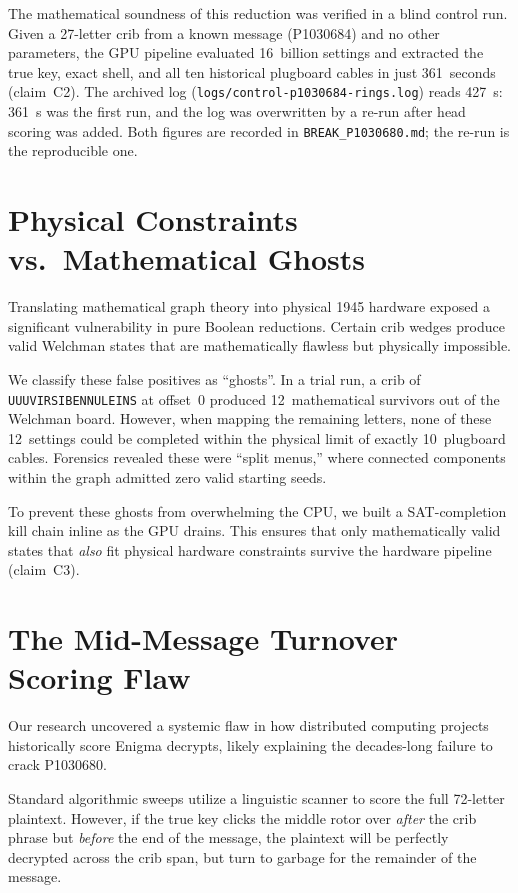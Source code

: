 \documentclass[11pt,a4paper]{article}
\begin{document}
The mathematical soundness of this reduction was verified in a blind
control run.
Given a 27-letter crib from a known message (P1030684) and no other
parameters, the GPU pipeline evaluated 16~billion settings and extracted
the true key, exact shell, and all ten historical plugboard cables in
just 361~seconds (claim~C2). The archived log
(\texttt{logs/control-p1030684-rings.log}) reads 427~s: 361~s was the first
run, and the log was overwritten by a re-run after head scoring was added.
Both figures are recorded in \texttt{BREAK\_P1030680.md}; the re-run is the
reproducible one.

\section{Physical Constraints vs.\ Mathematical Ghosts}

Translating mathematical graph theory into physical 1945 hardware exposed
a significant vulnerability in pure Boolean reductions.
Certain crib wedges produce valid Welchman states that are mathematically
flawless but physically impossible.

We classify these false positives as ``ghosts''.
In a trial run, a crib of \texttt{UUUVIRSIBENNULEINS} at offset~0 produced
12~mathematical survivors out of the Welchman board.
However, when mapping the remaining letters, none of these 12~settings
could be completed within the physical limit of exactly 10~plugboard
cables.
Forensics revealed these were ``split menus,'' where connected components
within the graph admitted zero valid starting seeds.

To prevent these ghosts from overwhelming the CPU, we built a
SAT-completion kill chain inline as the GPU drains.
This ensures that only mathematically valid states that \emph{also} fit
physical hardware constraints survive the hardware pipeline (claim~C3).

\section{The Mid-Message Turnover Scoring Flaw}

Our research uncovered a systemic flaw in how distributed computing
projects historically score Enigma decrypts, likely explaining the
decades-long failure to crack P1030680.

Standard algorithmic sweeps utilize a linguistic scanner to score the
full 72-letter plaintext.
However, if the true key clicks the middle rotor over \emph{after} the
crib phrase but \emph{before} the end of the message, the plaintext will
be perfectly decrypted across the crib span, but turn to garbage for the
remainder of the message.
\end{document}
